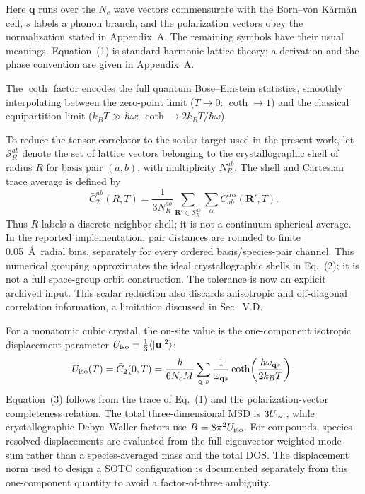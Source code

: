 \documentclass[aps,prb,reprint,amsmath,amssymb,floatfix]{revtex4-2}
\begin{document}
Here \(\mathbf q\) runs over the \(N_c\) wave vectors commensurate with the
Born--von K\'arm\'an cell, \(s\) labels a phonon branch, and the polarization
vectors obey the normalization stated in Appendix~A. The remaining symbols
have their usual meanings. Equation~(1) is standard harmonic-lattice theory;
a derivation and the phase convention are given in Appendix~A.

The \(\coth\) factor encodes the full quantum Bose--Einstein statistics,
smoothly interpolating between the zero-point limit (\(T\to 0\):
\(\coth\to 1\)) and the classical equipartition limit
(\(k_BT\gg\hbar\omega\): \(\coth\to 2k_BT/\hbar\omega\)).

To reduce the tensor correlator to the scalar target used in the present
work, let \(\mathcal S_R^{ab}\) denote the set of lattice vectors
belonging to the crystallographic shell of radius \(R\) for basis pair
\((a,b)\), with multiplicity \(N_R^{ab}\). The shell and Cartesian trace
average is defined by
\begin{equation}
\bar C_2^{ab}(R,T)=\frac{1}{3N_R^{ab}}
\sum_{\mathbf R'\in\mathcal S_R^{ab}}\sum_{\alpha}
C_{ab}^{\alpha\alpha}(\mathbf R',T).
\end{equation}
Thus \(R\) labels a discrete neighbor shell; it is not a continuum spherical
average. In the reported implementation, pair distances are rounded to finite
0.05~\AA\ radial bins, separately for every ordered basis/species-pair channel.
This numerical grouping approximates the ideal crystallographic shells in
Eq.~(2); it is not a full space-group orbit construction. The tolerance is now
an explicit archived input. This scalar reduction also discards anisotropic and
off-diagonal correlation information, a limitation discussed in Sec.~V.D.

For a monatomic cubic crystal, the on-site value is the one-component
isotropic displacement parameter
\(U_{\rm iso}=\frac13\langle|\mathbf u|^2\rangle\):
\begin{equation}
U_{\rm iso}(T)=\bar C_2(0,T)=
\frac{\hbar}{6N_cM}\sum_{\mathbf q,s}
\frac{1}{\omega_{\mathbf q s}}
\coth\!\left(\frac{\hbar\omega_{\mathbf q s}}{2k_BT}\right).
\end{equation}
Equation~(3) follows from the trace of Eq.~(1) and the polarization-vector
completeness relation. The total three-dimensional MSD is
\(3U_{\rm iso}\), while crystallographic Debye--Waller factors use
\(B=8\pi^2U_{\rm iso}\). For compounds, species-resolved displacements are
evaluated from the full eigenvector-weighted mode sum rather than a
species-averaged mass and the total DOS. The displacement norm used to design
a SOTC configuration is documented separately from this one-component
quantity to avoid a factor-of-three ambiguity.
\end{document}
